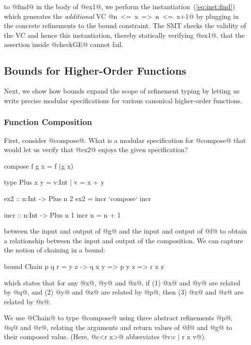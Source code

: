  to @find@ in the body of @ex1@, we perform
the instantiation~(\ref{eq:inst:find}) which generates the
\emph{additional} VC
%
\hbox{@n <=  x => n <=  x+1@}
%
by plugging in the concrete refinements to the bound constraint.
%
The SMT checks the validity of the VC
and hence this instantiation, thereby statically
verifying @ex1@, \ie that the assertion inside
@checkGE@ cannot fail.
%

\subsection{Bounds for Higher-Order Functions}

Next, we show how bounds expand the scope of refinement typing by
letting us write precise modular specifications for various canonical
higher-order functions.

\subsubsection{Function Composition}\label{sec:compose}

First, consider @compose@. What is a modular specification
for @compose@ that would let us verify that @ex2@ enjoys
the given specification?
%
\begin{code}
  compose f g x = f (g x)

  type Plus x y = {v:Int | v = x + y}
  
  ex2    :: n:Int -> Plus n 2
  ex2    = incr `compose` incr

  incr   :: n:Int -> Plus n 1
  incr n = n + 1
\end{code}

 between the
input and output of @g@ and the input and output of @f@ to
obtain a relationship between the input and output of the
composition. We can capture the notion of chaining in a bound:
%
\begin{code}
  bound Chain p q r = \x y z ->
        q x y => p y z => r x z
\end{code}
%
which states that for any @x@, @y@ and @z@, if
%
(1) @x@ and @y@ are related by @q@, and
(2) @y@ and @z@ are related by @p@, then
(3) @x@ and @z@ are related by @r@.

We use @Chain@ to type @compose@ using three abstract
refinements @p@, @q@ and @r@, relating the arguments
and return values of @f@ and @g@ to their composed value.
%
(Here, @c<r x>@ abbreviates @{v:c | r x v}@).


